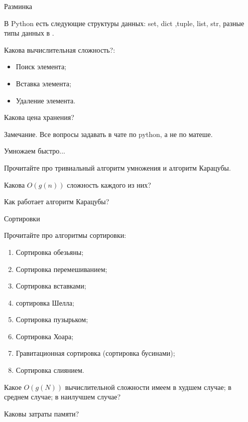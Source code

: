 \begin{frame}{Разминка}
	

	В Python есть следующие структуры данных:
	set, dict ,tuple, list, str, разные типы данных в .
	
	
	Какова вычислительная сложность?:
	\begin{itemize}
		\item Поиск элемента;
		\item Вставка элемента;
		\item Удаление элемента.
	\end{itemize}

	Какова цена хранения?
	
	\begin{block}{Замечание.}
		Все вопросы задавать в чате по python, а не по матеше.
	\end{block}
	
	
\end{frame}

\begin{frame}{Умножаем быстро...}
	
	Прочитайте про тривиальный алгоритм умножения и алгоритм Карацубы.
	
	Какова $O(g(n))$ сложность каждого из них?
	
	Как работает алгоритм Карацубы?
	
\end{frame}

\begin{frame}{Сортировки}
	
	Прочитайте про алгоритмы сортировки:
	\begin{enumerate}
		\item Сортировка обезьяны;
		\item Сортировка перемешиванием;
		\item Сортировка вставками;
		\item сортировка Шелла;
		\item Сортировка пузырьком;
		\item Сортировка Хоара;
		\item Гравитационная сортировка (сортировка бусинами);
		\item Сортировка слиянием.
	\end{enumerate}
	
	Какое $O(g(N))$ вычислительной сложности
	имеем 
	в худшем случае; 
	в среднем случае; 
	в наилучшем случае?
	
	Каковы затраты памяти?
	
	
\end{frame}


